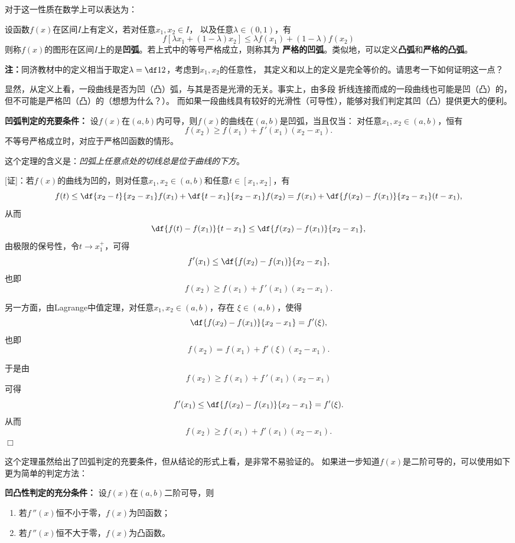对于这一性质在数学上可以表达为：

\begin{thx}
	设函数$f(x)$在区间$I$上有定义，若对任意$x_1,x_2\in I$，
	以及任意$\lambda\in(0,1)$，有
	$$f[\lambda x_1+(1-\lambda)x_2]\leq\lambda f(x_1)+(1-\lambda)f(x_2)$$
	则称$f(x)$的图形在区间$I$上的是{\bf 凹弧}。若上式中的等号严格成立，则称其为
	{\bf 严格的凹弧}。类似地，可以定义{\bf 凸弧}和{\bf 严格的凸弧}。
\end{thx}
{\bf 注：}同济教材中的定义相当于取定$\lambda=\df12$，考虑到$x_1,x_2$的任意性，
其定义和以上的定义是完全等价的。请思考一下如何证明这一点？

显然，从定义上看，一段曲线是否为凹（凸）弧，与其是否是光滑的无关。事实上，由多段
折线连接而成的一段曲线也可能是凹（凸）的，但不可能是严格凹（凸）的（想想为什么？）。
而如果一段曲线具有较好的光滑性（可导性），能够对我们判定其凹（凸）提供更大的便利。

\begin{thx}
	{\bf 凹弧判定的充要条件：}
	设$f(x)$在$(a,b)$内可导，则$f(x)$的曲线在$(a,b)$是凹弧，当且仅当：
	对任意$x_1,x_2\in(a,b)$，恒有
	$$f(x_2)\geq f(x_1)+f\,'(x_1)(x_2-x_1). $$
	不等号严格成立时，对应于严格凹函数的情形。
\end{thx}
这个定理的含义是：{\it 凹弧上任意点处的切线总是位于曲线的下方}。

[证]：若$f(x)$的曲线为凹的，则对任意$x_1,x_2\in(a,b)$和任意$t\in[x_1,x_2]$，有
$$f(t)\leq\df{x_2-t}{x_2-x_1}f(x_1)+\df{t-x_1}{x_2-x_1}f(x_2)
=f(x_1)+\df{f(x_2)-f(x_1)}{x_2-x_1}(t-x_1),$$
从而
$$\df{f(t)-f(x_1)}{t-x_1}\leq\df{f(x_2)-f(x_1)}{x_2-x_1},$$
由极限的保号性，令$t\to x_1^+$，可得
$$f'(x_1)\leq\df{f(x_2)-f(x_1)}{x_2-x_1},$$
也即
$$f(x_2)\geq f(x_1)+f\,'(x_1)(x_2-x_1).$$

另一方面，由Lagrange中值定理，对任意$x_1,x_2\in(a,b)$，存在
$\xi\in(a,b)$，使得
$$\df{f(x_2)-f(x_1)}{x_2-x_1}=f'(\xi),$$
也即
$$f(x_2)=f(x_1)+f'(\xi)(x_2-x_1).$$

于是由
$$f(x_2)\geq f(x_1)+f\,'(x_1)(x_2-x_1)$$
可得
$$f'(x_1)\leq\df{f(x_2)-f(x_1)}{x_2-x_1}=f'(\xi).$$
从而
$$f(x_2)\geq f(x_1)+f'(x_1)(x_2-x_1).$$
\hfill$\Box$

这个定理虽然给出了凹弧判定的充要条件，但从结论的形式上看，是非常不易验证的。
如果进一步知道$f(x)$是二阶可导的，可以使用如下更为简单的判定方法：

\begin{thx}
	{\bf 凹凸性判定的充分条件：}
	设$f(x)$在$(a,b)$二阶可导，则
	\begin{enumerate}[(1)]
	  \item 若$f\,''(x)$恒不小于零，$f(x)$为凹函数；
	  \item 若$f\,''(x)$恒不大于零，$f(x)$为凸函数。
	\end{enumerate}
\end{thx}

